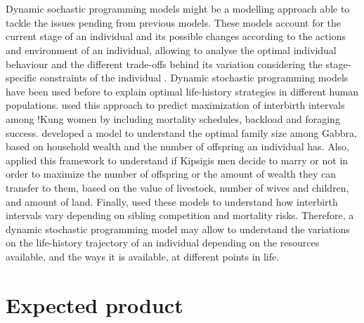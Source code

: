 \documentclass{article}
\begin{document}
\\\\
Dynamic sochastic programming models might be a modelling approach able to tackle the issues pending from previous models. These models account for the current stage of an individual and its possible changes according to the actions and environment of an individual, allowing to analyse the optimal individual behaviour and the different trade-offs behind its variation considering the stage-specific constraints of the individual \citep{houston1988dynamic,clark2000dynamic}. Dynamic stochastic programming models have been used before to explain optimal life-history strategies in different human populations. \cite{anderies1996adaptive} used this approach to predict maximization of interbirth intervals among !Kung women by including mortality schedules, backload and foraging success. \cite{mace1996have} developed a model to understand the optimal family size among Gabbra, based on household wealth and the number of offspring an individual has. Also, \cite{luttbeg2000marry} applied this framework to understand if Kipsigis men decide to marry or not in order to maximize the number of offspring or the amount of wealth they can transfer to them, based on the value of livestock, number of wives and children, and amount of land. Finally, \cite{thomas2015dynamic} used these models to understand how interbirth intervals vary depending on sibling competition and mortality risks. Therefore, a dynamic stochastic programming model may allow to understand the variations on the life-history trajectory of an individual depending on the resources available, and the ways it is available, at different points in life.

\section{Expected product}
\end{document}
